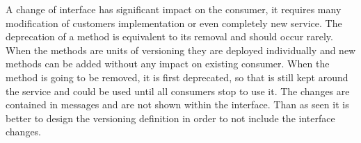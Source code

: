 
A change of interface has significant impact on the consumer, it requires many modification of customers implementation or even completely new service. The deprecation of a method is equivalent to its removal and should occur rarely.
When the methods are units of versioning they are deployed individually and new methods can be added without any impact on existing consumer. When the method is going to be removed, it is first deprecated, so that is still kept around the service and could be used until all consumers stop to use it. The changes are contained in messages and are not shown within the interface.
Than as seen it is better to design the versioning definition in order to not include the interface changes.






